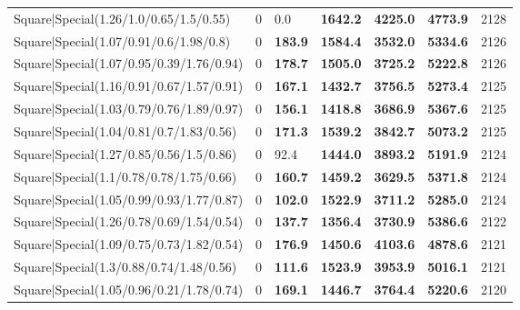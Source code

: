 \begin{tabular}{lrllllr}
 Square|Special(1.26/1.0/0.65/1.5/0.55)                        &             0   & 0.0            & \textbf{1642.2} & \textbf{4225.0} & \textbf{4773.9} &         2128 \\
 Square|Special(1.07/0.91/0.6/1.98/0.8)                        &             0   & \textbf{183.9} & \textbf{1584.4} & \textbf{3532.0} & \textbf{5334.6} &         2126 \\
 Square|Special(1.07/0.95/0.39/1.76/0.94)                      &             0   & \textbf{178.7} & \textbf{1505.0} & \textbf{3725.2} & \textbf{5222.8} &         2126 \\
 Square|Special(1.16/0.91/0.67/1.57/0.91)                      &             0   & \textbf{167.1} & \textbf{1432.7} & \textbf{3756.5} & \textbf{5273.4} &         2125 \\
 Square|Special(1.03/0.79/0.76/1.89/0.97)                      &             0   & \textbf{156.1} & \textbf{1418.8} & \textbf{3686.9} & \textbf{5367.6} &         2125 \\
 Square|Special(1.04/0.81/0.7/1.83/0.56)                       &             0   & \textbf{171.3} & \textbf{1539.2} & \textbf{3842.7} & \textbf{5073.2} &         2125 \\
 Square|Special(1.27/0.85/0.56/1.5/0.86)                       &             0   & 92.4           & \textbf{1444.0} & \textbf{3893.2} & \textbf{5191.9} &         2124 \\
 Square|Special(1.1/0.78/0.78/1.75/0.66)                       &             0   & \textbf{160.7} & \textbf{1459.2} & \textbf{3629.5} & \textbf{5371.8} &         2124 \\
 Square|Special(1.05/0.99/0.93/1.77/0.87)                      &             0   & \textbf{102.0} & \textbf{1522.9} & \textbf{3711.2} & \textbf{5285.0} &         2124 \\
 Square|Special(1.26/0.78/0.69/1.54/0.54)                      &             0   & \textbf{137.7} & \textbf{1356.4} & \textbf{3730.9} & \textbf{5386.6} &         2122 \\
 Square|Special(1.09/0.75/0.73/1.82/0.54)                      &             0   & \textbf{176.9} & \textbf{1450.6} & \textbf{4103.6} & \textbf{4878.6} &         2121 \\
 Square|Special(1.3/0.88/0.74/1.48/0.56)                       &             0   & \textbf{111.6} & \textbf{1523.9} & \textbf{3953.9} & \textbf{5016.1} &         2121 \\
 Square|Special(1.05/0.96/0.21/1.78/0.74)                      &             0   & \textbf{169.1} & \textbf{1446.7} & \textbf{3764.4} & \textbf{5220.6} &         2120 \\

\end{tabular}
